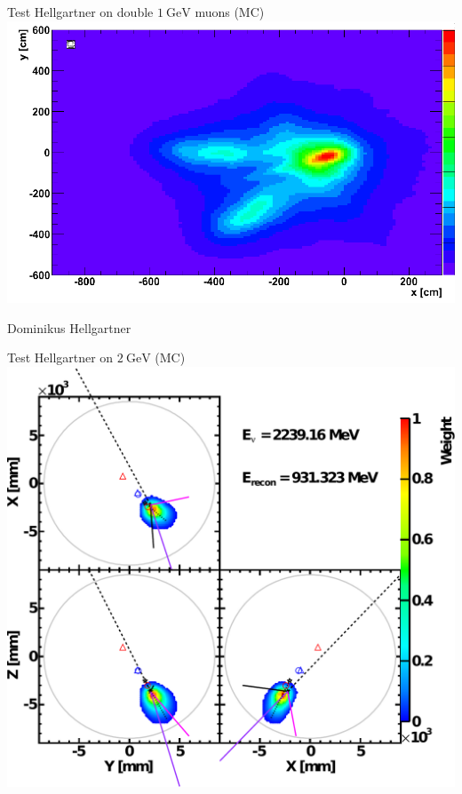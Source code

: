 \documentclass[14pt]{beamer}
\begin{document}
\begin{frame}{\normalsize Test Hellgartner on double
	$\SI{1}{\giga\electronvolt}$ muons (MC)}
	\includegraphics[width=\linewidth]{hellgartner_double_muon.pdf}

	{\footnotesize Dominikus Hellgartner}
\end{frame}

\begin{frame}{Test Hellgartner on
	$\SI{2}{\giga\electronvolt}$ \Pnue (MC)}
	\centering
	\includegraphics[width=0.8\linewidth]{hellgartner_reconstruction_2gev_nue_klg4sim.pdf}
\end{frame}
\end{document}
